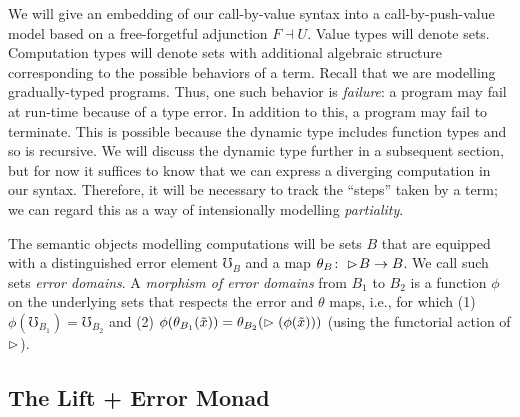 We will give an embedding of our call-by-value syntax into a call-by-push-value
model based on a free-forgetful adjunction $F \dashv U$. Value types will denote
sets. Computation types will denote sets with additional algebraic structure
corresponding to the possible behaviors of a term. Recall that we are modelling
gradually-typed programs. Thus, one such behavior is \emph{failure}: a program
may fail at run-time because of a type error. In addition to this, a program may
fail to terminate. This is possible because the dynamic type includes function
types and so is recursive. We will discuss the dynamic type further in a
subsequent section, but for now it suffices to know that we can express a
diverging computation in our syntax. Therefore, it will be necessary to track
the ``steps'' taken by a term; we can regard this as a way of intensionally
modelling \emph{partiality}.

The semantic objects modelling computations will be sets $B$ that are equipped
with a distinguished error element $\mho_B$ and a map $\theta_B \colon \vartriangleright \hspace{-0.2em}
B \to B$. We call such sets \emph{error domains}. A \emph{morphism of error
domains} from $B_1$ to $B_2$ is a function $\phi$ on the underlying sets that
respects the error and $\theta$ maps, i.e., for which 
%
(1) $\phi(\mho_{B_1}) = \mho_{B_2}$ and
%
(2) $\phi(\theta_{B_1}(\tilde{x})) = \theta_{B_2}(\vartriangleright (\phi(\tilde{x})))$
(using the functorial action of $\vartriangleright$).

\subsection{The Lift + Error Monad}\label{sec:lift-monad}



